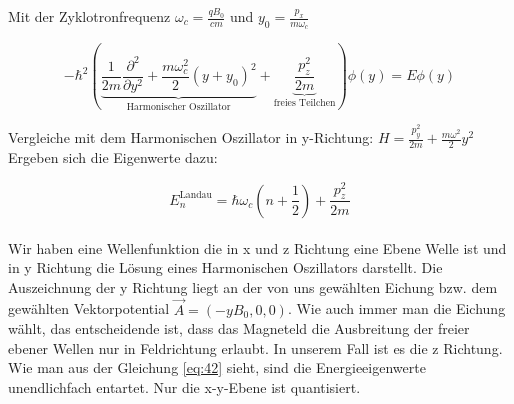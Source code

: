 Mit der Zyklotronfrequenz \( \omega_c = \frac{qB_0}{cm} \) und \(y_0 = \frac{p_x}{m\omega_c}\)

\[  - \hbar^2\left( \underbrace{ \frac{1}{2m} \frac{\partial^2}{\partial y^2} + \frac{m\omega_c^2}{2} (y +  y_0 )^2}_{\text{Harmonischer Oszillator}} +\underbrace{ \frac{p_z^2}{2m}}_{\text{freies Teilchen}}  \right)\phi(y) = E \phi(y) \]


Vergleiche mit dem Harmonischen Oszillator in y-Richtung: \( H = \frac{p^2_y}{2m} + \frac{m\omega^2}{2}y^2 \) Ergeben sich die Eigenwerte dazu:

\begin{equation}
\label{eq:42}
 \boxed{E_n^{\text{Landau}} = \hbar\omega_c(n+\frac{1}{2}) + \frac{p_z^2}{2m} }
\end{equation}
\\
Wir haben eine Wellenfunktion die in x und z Richtung eine Ebene Welle ist und in y Richtung die Lösung eines Harmonischen Oszillators darstellt. Die Auszeichnung der y Richtung liegt an der von uns gewählten Eichung bzw. dem gewählten Vektorpotential  \(\vec A = (-yB_0,0,0)\). Wie auch immer man die Eichung wählt, das entscheidende ist, dass das Magneteld die Ausbreitung der freier ebener Wellen nur in Feldrichtung erlaubt. In unserem Fall ist es die z Richtung. Wie man aus der Gleichung \eqref{eq:42} sieht, sind die Energieeigenwerte unendlichfach entartet. Nur die x-y-Ebene ist quantisiert.





